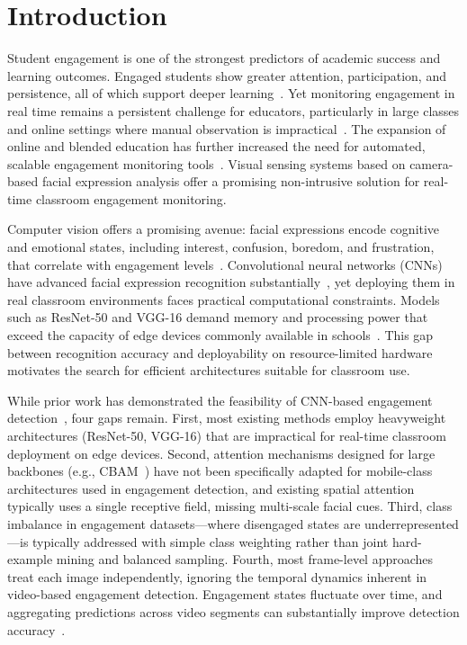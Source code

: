 \documentclass[sensors,article,submit,pdftex,moreauthors]{Definitions/mdpi}
\begin{document}
\section{Introduction}

Student engagement is one of the strongest predictors of academic success and learning outcomes. Engaged students show greater attention, participation, and persistence, all of which support deeper learning~\cite{fredricks2004school,dixson2015measuring}. Yet monitoring engagement in real time remains a persistent challenge for educators, particularly in large classes and online settings where manual observation is impractical~\cite{whitehill2014faces}. The expansion of online and blended education has further increased the need for automated, scalable engagement monitoring tools~\cite{savchenko2022emotions}. Visual sensing systems based on camera-based facial expression analysis offer a promising non-intrusive solution for real-time classroom engagement monitoring.

Computer vision offers a promising avenue: facial expressions encode cognitive and emotional states, including interest, confusion, boredom, and frustration, that correlate with engagement levels~\cite{kleinsmith2013affective,jampour2022multiview}. Convolutional neural networks (CNNs) have advanced facial expression recognition substantially~\cite{bengio2013representation}, yet deploying them in real classroom environments faces practical computational constraints. Models such as ResNet-50 and VGG-16 demand memory and processing power that exceed the capacity of edge devices commonly available in schools~\cite{howard2017mobilenets}. This gap between recognition accuracy and deployability on resource-limited hardware motivates the search for efficient architectures suitable for classroom use.

While prior work has demonstrated the feasibility of CNN-based engagement detection~\cite{whitehill2014faces,tonguc2020automatic,savchenko2022emotions}, four gaps remain\label{sec:intro_gaps}. First, most existing methods employ heavyweight architectures (ResNet-50, VGG-16) that are impractical for real-time classroom deployment on edge devices. Second, attention mechanisms designed for large backbones (e.g., CBAM~\cite{woo2018cbam}) have not been specifically adapted for mobile-class architectures used in engagement detection, and existing spatial attention typically uses a single receptive field, missing multi-scale facial cues. Third, class imbalance in engagement datasets---where disengaged states are underrepresented---is typically addressed with simple class weighting rather than joint hard-example mining and balanced sampling. Fourth, most frame-level approaches treat each image independently, ignoring the temporal dynamics inherent in video-based engagement detection. Engagement states fluctuate over time, and aggregating predictions across video segments can substantially improve detection accuracy~\cite{yue2015beyond}.
\end{document}
